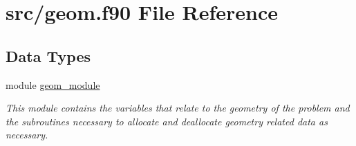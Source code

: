 \hypertarget{geom_8f90}{\section{src/geom.f90 File Reference}
\label{geom_8f90}
}
\subsection*{Data Types}
\begin{DoxyCompactItemize}
\item 
module \hyperlink{classgeom__module}{geom\-\_\-module}
\begin{DoxyCompactList}\small\item\em This module contains the variables that relate to the geometry of the problem and the subroutines necessary to allocate and deallocate geometry related data as necessary. \end{DoxyCompactList}\end{DoxyCompactItemize}
